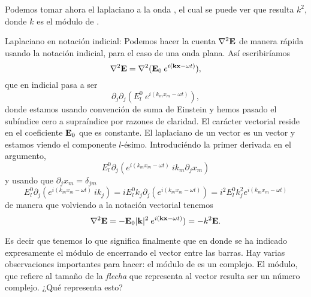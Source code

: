 \documentclass[10pt,oneside]{CBFT_article}
\begin{document}
Podemos tomar ahora el laplaciano a la onda , el cual se puede ver que 
resulta $k^2$, donde $k$ es el módulo de .

\begin{notas}{Laplaciano en notación indicial:}
Podemos hacer la cuenta $\nabla^2\vb{E}$ de manera rápida usando la notación 
indicial, para el caso de una onda plana. Así escribiríamos
\[ 
\nabla^2\vb{E} = \nabla^2(\vb{E}_0 \: e^{i(\vb{k}\vb{x}-\omega t)}),
\]
que en indicial pasa a ser
\[
\partial_j\partial_j (E_{l}^0 \: e^{i( k_mx_m-\omega t)}),
\]
donde estamos usando convención de suma de Einstein y hemos pasado el subíndice
cero a supraíndice por razones de claridad. El carácter vectorial reside en el
coeficiente $\vb{E}_0$ que es constante. El laplaciano de un vector es un vector
y estamos viendo el componente $l$-ésimo. Introduciéndo la primer derivada en el
argumento,
\[ 
E_l^0 \partial_j(e^{i( k_mx_m-\omega t)}\: ik_m \partial_jx_m)
\]
y usando que $\partial_jx_m=\delta_{jm}$
\[ 
E_l^0 \partial_j(e^{i( k_mx_m-\omega t)}\: ik_j)
=
i E_l^0 k_j \partial_j(e^{i( k_mx_m-\omega t)})
=
i^2 E_l^0 k_j^2 e^{i( k_mx_m-\omega t)}
\]
de manera que volviendo a la notación vectorial tenemos
\[
\nabla^2 \vb{E} = - \vb{E}_0 |\vb{k}|^2 \: e^{i(\vb{k}\vb{x}-\omega t)}) = - k^2 \vb{E}. 
\]
\end{notas}

Es decir que tenemos
lo que significa finalmente que
en donde se ha indicado expresamente el módulo de  encerrando el vector 
entre las barras. Hay varias observaciones importantes para hacer: el módulo de 
 es un complejo. El módulo, que refiere al tamaño de la {\it flecha} que 
representa al vector resulta ser un número complejo. ¿Qué representa esto?



\end{document}
